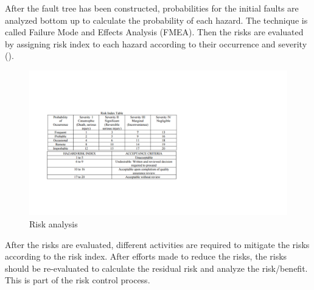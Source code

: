 After the fault tree has been constructed, probabilities for the initial faults are analyzed bottom up to calculate the probability of each hazard. The technique is called Failure Mode and Effects Analysis (FMEA). Then the risks are evaluated by assigning risk index to each hazard according to their occurrence and severity (). 
\begin{figure}[t]
		\centering
		\includegraphics[width=\textwidth]{figs/risk_analysis.pdf}
		\caption{Risk analysis}
		\label{fig:risk_ana}
\end{figure}

After the risks are evaluated, different activities are required to mitigate the risks according to the risk index. After efforts made to reduce the risks, the risks should be re-evaluated to calculate the residual risk and analyze the risk/benefit. This is part of the risk control process.
